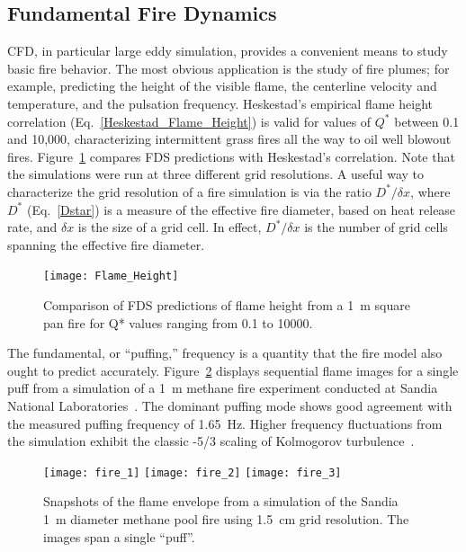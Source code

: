 \documentclass[graybox]{svmult}
\begin{document}
\subsection{Fundamental Fire Dynamics}

CFD, in particular large eddy simulation, provides a convenient means to study basic fire behavior. The most obvious application is the study of fire plumes; for example, predicting the height of the visible flame, the centerline velocity and temperature, and the pulsation frequency. Heskestad's empirical flame height correlation (Eq.~\ref{Heskestad_Flame_Height}) is valid for values of  $Q^*$ between 0.1 and 10,000, characterizing intermittent grass fires all the way to oil well blowout fires. Figure~\ref{Flame_Height} compares FDS predictions with Heskestad's correlation. Note that the simulations were run at three different grid resolutions. A useful way to characterize the grid resolution of a fire simulation is via the ratio $D^*/\delta x$, where $D^*$ (Eq.~\ref{Dstar}) is a measure of the effective fire diameter, based on heat release rate, and $\delta x$ is the size of a grid cell. In effect, $D^*/\delta x$ is the number of grid cells spanning the effective fire diameter.
\begin{figure}[ht]
\begin{center}
\texttt{[image: Flame\_Height]}
\end{center}
\caption{Comparison of FDS predictions of flame height from a 1~m square pan fire for Q* values ranging from
0.1 to 10000.}
\label{Flame_Height}
\end{figure}

The fundamental, or ``puffing,'' frequency is a quantity that the fire model also ought to predict accurately. Figure~\ref{Sandia_Simulation} displays sequential flame images for a single puff from a simulation of a 1~m methane fire experiment conducted at Sandia National Laboratories~\cite{Tieszen:2002}. The dominant puffing mode shows good agreement with the measured puffing frequency of 1.65~Hz. Higher frequency fluctuations from the simulation exhibit the classic -5/3 scaling of Kolmogorov turbulence~\cite{Pope:2000}.
\begin{figure}[t]
\begin{center}
\texttt{[image: fire\_1]}
\texttt{[image: fire\_2]}
\texttt{[image: fire\_3]}
\end{center}
\caption{Snapshots of the flame envelope from a simulation of the Sandia 1~m diameter methane pool fire using 1.5~cm grid resolution.  The images span a single ``puff''.}
\label{Sandia_Simulation}
\end{figure}
\end{document}
